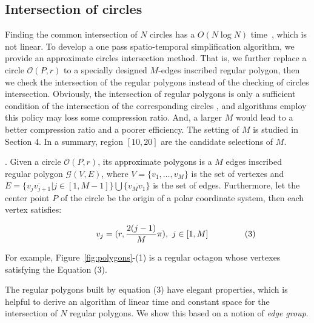 \subsection{Intersection of circles }
Finding the common intersection of $N$ circles has a ${O(N\log N)}$ time~\cite{Shamos:Circle}, which is not linear.
To develop a one pass spatio-temporal simplification algorithm, we provide an approximate circles intersection method.
That is, we further replace a circle $\mathcal{O}(P, r)$ to a specially designed $M$-edges inscribed regular polygon,
then we check the intersection of the regular polygons instead of the checking of circles intersection.
Obviously, the intersection of regular polygons is only a sufficient condition of the intersection of the corresponding circles , and
algorithms employ this policy may loss some compression ratio.
And, a larger $M$ would lead to a better compression ratio and a poorer efficiency.
\textcolor[rgb]{0.00,0.07,1.00}{The setting of $M$ is studied in Section 4. In a summary, region $[10, 20]$ are the candidate selections of $M$.}

.
Given a circle $\mathcal{O}(P, r)$, its approximate polygons is a $M$ edges inscribed regular polygon $\mathcal{G}(V, E)$,
where $V=\{v_1, \ldots, v_{M}\}$ is the set of vertexes and
$E= \{\overline{v_jv_{j+1}}| j\in [1,M-1]\} \bigcup \{\overline{v_Mv_1}\}$ is the set of edges.
Furthermore, let the center point $P$ of the circle be the origin of a polar coordinate system, then each vertex satisfies:

\vspace{-2ex}
\begin{equation*}
\label{equ-regular-polygon}
    \begin{aligned}
        \hspace{10ex}  v_j = (r, \frac{2(j-1)}{M}\pi), ~j \in [1, M]    \hspace{10ex} (3)\\
    \end{aligned}
\end{equation*}
\vspace{-1ex}


For example, Figure~\ref{fig:polygons}-(1) is a regular octagon whose vertexes satisfying the Equation (3).

The regular polygons built by equation (3) have elegant properties, which is helpful to derive an algorithm of linear time and constant space
for the intersection of $N$ regular polygons. We show this based on a notion of \emph{edge group}.


